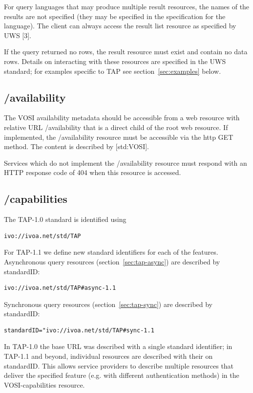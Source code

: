 \documentclass[11pt,letter]{ivoa}
\begin{document}
For query languages that may produce multiple result resources, the names of the 
results are not specified (they may be specified in the specification for the 
language). The client can always access the result list resource as specified by 
UWS [3].

If the query returned no rows, the result resource must exist and contain no 
data rows. Details on interacting with these resources are specified in the UWS 
standard; for examples specific to TAP see section~\ref{sec:examples} below.

\subsection{/availability}
\label{sec:vosi-availability}

The VOSI availability metadata should be accessible from a web resource with 
relative URL /availability that is a direct child of the root web resource. If 
implemented, the /availability resource must be accessible via the http GET 
method. The content is described by [std:VOSI].

Services which do not implement the /availability resource must respond with an 
HTTP response code of 404 when this resource is accessed.

\subsection{/capabilities}
\label{sec:vosi-capabilities}

The TAP-1.0 standard is identified using 
\begin{verbatim}
ivo://ivoa.net/std/TAP
\end{verbatim}

For TAP-1.1 we define new standard identifiers for each of the 
features. Asynchronous query resources (section~\ref{sec:tap-async}) are described by standardID: 

\begin{verbatim}
ivo://ivoa.net/std/TAP#async-1.1 
\end{verbatim}

Synchronous query resources (section~\ref{sec:tap-sync}) are described by standardID:

\begin{verbatim}
standardID="ivo://ivoa.net/std/TAP#sync-1.1 
\end{verbatim}

In TAP-1.0 the base URL was described with a single standard identifier; in 
TAP-1.1 and beyond, individual resources are described with their on 
standardID. This allows service providers to describe multiple resources that 
deliver the specified feature (e.g. with different authentication methods) in 
the VOSI-capabilities resource.
\end{document}
